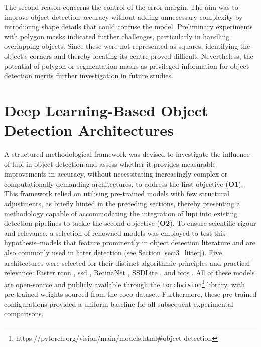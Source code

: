 The second reason concerns the control of the error margin. The aim was to improve object detection accuracy without adding unnecessary complexity by introducing shape details that could confuse the model. Preliminary experiments with polygon masks indicated further challenges, particularly in handling overlapping objects. Since these were not represented as squares, identifying the object’s corners and thereby locating its centre proved difficult. Nevertheless, the potential of polygon or segmentation masks as privileged information for object detection merits further investigation in future studies.


\section{Deep Learning-Based Object Detection Architectures}
\label{sec:4_distillation_architectures}

A structured methodological framework was devised to investigate the influence of \gls{lupi} in object detection and assess whether it provides measurable improvements in accuracy, without necessitating increasingly complex or computationally demanding architectures, to address the first objective (\textbf{O1}). This framework relied on utilising pre-trained models with few structural adjustments, as briefly hinted in the preceding sections, thereby presenting a methodology capable of accommodating the integration of \gls{lupi} into existing detection pipelines to tackle the second objective (\textbf{O2}).
To ensure scientific rigour and relevance, a selection of renowned models was employed to test this hypothesis--models that feature prominently in object detection literature and are also commonly used in litter detection (see Section \ref{sec:3_litter}). Five architectures were selected for their distinct algorithmic principles and practical relevance: Faster \gls{rcnn} \cite{rcnn}, \gls{ssd} \cite{ssd}, RetinaNet \cite{retinanet}, SSDLite \cite{ssdlite}, and \gls{fcos} \cite{fcos}. All of these models are open-source and publicly available through the \verb|torchvision|\footnote{https://pytorch.org/vision/main/models.html\#object-detection} library, with pre-trained weights sourced from the \gls{coco} dataset. Furthermore, these pre-trained configurations provided a uniform baseline for all subsequent experimental comparisons.

